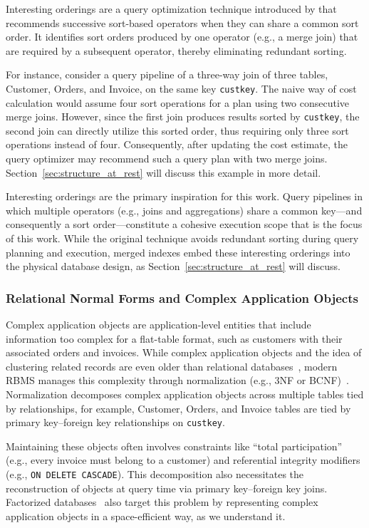 \documentclass[sigconf, pdfa, nonacm]{acmart}
\begin{document}
Interesting orderings are a query optimization technique introduced by \citet{selinger1979access} that recommends successive sort-based operators when they can share a common sort order.
It identifies sort orders produced by one operator (e.g., a merge join) that are required by a subsequent operator, thereby eliminating redundant sorting.

For instance, consider a query pipeline of a three-way join of three tables, Customer, Orders, and Invoice, on the same key \texttt{custkey}.
The naive way of cost calculation would assume four sort operations for a plan using two consecutive merge joins.
However, since the first join produces results sorted by \texttt{custkey}, the second join can directly utilize this sorted order, thus requiring only three sort operations instead of four.
Consequently, after updating the cost estimate, the query optimizer may recommend such a query plan with two merge joins.
Section~\ref{sec:structure_at_rest} will discuss this example in more detail.

Interesting orderings are the primary inspiration for this work.
Query pipelines in which multiple operators (e.g., joins and aggregations) share a common key---and consequently a sort order---constitute a cohesive execution scope that is the focus of this work.
While the original technique avoids redundant sorting during query planning and execution, merged indexes embed these interesting orderings into the physical database design, as Section~\ref{sec:structure_at_rest} will discuss.

\subsubsection{Relational Normal Forms and Complex Application Objects}\label{subsec:normal_forms}

Complex application objects are application-level entities that include information too complex for a flat-table format, such as customers with their associated orders and invoices.
While complex application objects and the idea of clustering related records are even older than relational databases~\cite{DARMONT199655},
modern RBMS manages this complexity through normalization (e.g., 3NF or BCNF)~\cite{codd70, kent83}.
Normalization decomposes complex application objects across multiple tables tied by relationships, for example, Customer, Orders, and Invoice tables are tied by primary key--foreign key relationships on \texttt{custkey}.

Maintaining these objects often involves constraints like ``total participation'' (e.g., every invoice must belong to a customer) and referential integrity modifiers (e.g., \texttt{ON DELETE CASCADE}). This decomposition also necessitates the reconstruction of objects at query time via primary key--foreign key joins. Factorized databases~\cite{factorizedDB} also target this problem by representing complex application objects in a space-efficient way, as we understand it.
\end{document}
